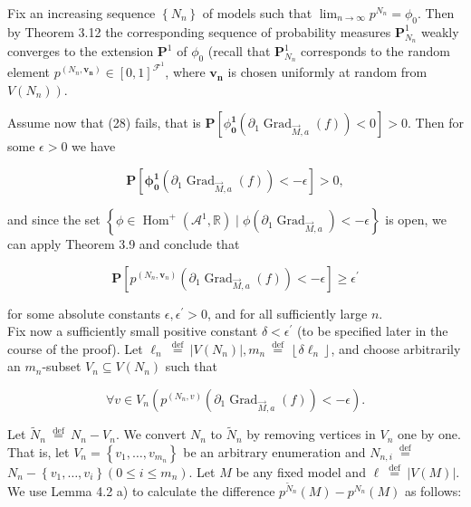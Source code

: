 \documentclass[10pt]{article}
\begin{document}
Fix an increasing sequence $\left\{N_{n}\right\}$ of models such that $\lim _{n \rightarrow \infty} p^{N_{n}}=\phi_{0}$. Then by Theorem 3.12 the corresponding sequence of probability measures $\mathbf{P}_{N_{n}}^{1}$ weakly converges to the extension $\mathbf{P}^{1}$ of $\phi_{0}$ (recall that $\mathbf{P}_{N_{n}}^{1}$ corresponds to the random element $p^{\left(N_{n}, \boldsymbol{v}_{\boldsymbol{n}}\right)} \in[0,1]^{\mathcal{F}^{1}}$, where $\boldsymbol{v}_{\boldsymbol{n}}$ is chosen uniformly at random from $\left.V\left(N_{n}\right)\right)$.

Assume now that (28) fails, that is $\mathbf{P}\left[\phi_{\mathbf{0}}^{\mathbf{1}}\left(\partial_{1} \operatorname{Grad}_{\vec{M}, a}(f)\right)<0\right]>0$. Then for some $\epsilon>0$ we have

$$
\mathbf{P}\left[\boldsymbol{\phi}_{\mathbf{0}}^{\mathbf{1}}\left(\partial_{1} \operatorname{Grad}_{\vec{M}, a}(f)\right)<-\epsilon\right]>0,
$$

and since the set $\left\{\phi \in \operatorname{Hom}^{+}\left(\mathcal{A}^{1}, \mathbb{R}\right) \mid \phi\left(\partial_{1} \operatorname{Grad}_{\vec{M}, a}\right)<-\epsilon\right\}$ is open, we can apply Theorem 3.9 and conclude that

$$
\mathbf{P}\left[p^{\left(N_{n}, \boldsymbol{v}_{n}\right)}\left(\partial_{1} \operatorname{Grad}_{\vec{M}, a}(f)\right)<-\epsilon\right] \geq \epsilon^{\prime}
$$

for some absolute constants $\epsilon, \epsilon^{\prime}>0$, and for all sufficiently large $n$.\\
Fix now a sufficiently small positive constant $\delta<\epsilon^{\prime}$ (to be specified later in the course of the proof). Let $\ell_{n} \stackrel{\text { def }}{=}\left|V\left(N_{n}\right)\right|, m_{n} \stackrel{\text { def }}{=}\left\lfloor\delta \ell_{n}\right\rfloor$, and choose arbitrarily an $m_{n}$-subset $V_{n} \subseteq V\left(N_{n}\right)$ such that


\begin{equation*}
\forall v \in V_{n}\left(p^{\left(N_{n}, v\right)}\left(\partial_{1} \operatorname{Grad}_{\vec{M}, a}(f)\right)<-\epsilon\right) . \tag{29}
\end{equation*}


Let $\widetilde{N}_{n} \stackrel{\text { def }}{=} N_{n}-V_{n}$. We convert $N_{n}$ to $\widetilde{N}_{n}$ by removing vertices in $V_{n}$ one by one. That is, let $V_{n}=\left\{v_{1}, \ldots, v_{m_{n}}\right\}$ be an arbitrary enumeration and $N_{n, i} \stackrel{\text { def }}{=}$ $N_{n}-\left\{v_{1}, \ldots, v_{i}\right\}\left(0 \leq i \leq m_{n}\right)$. Let $M$ be any fixed model and $\ell \stackrel{\text { def }}{=}|V(M)|$. We use Lemma 4.2 a) to calculate the difference $p^{\widetilde{N}_{n}}(M)-p^{N_{n}}(M)$ as follows:
\end{document}
